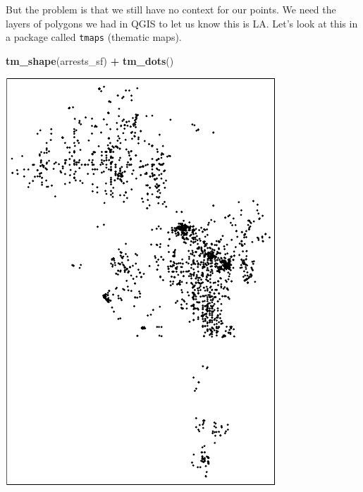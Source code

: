 \documentclass[]{book}
\newenvironment{Shaded}{\begin{snugshade}}{\end{snugshade}}
\newcommand{\KeywordTok}[1]{\textcolor[rgb]{0.13,0.29,0.53}{\textbf{#1}}}
\newcommand{\NormalTok}[1]{#1}
\newcommand{\OperatorTok}[1]{\textcolor[rgb]{0.81,0.36,0.00}{\textbf{#1}}}
\newcommand{\StringTok}[1]{\textcolor[rgb]{0.31,0.60,0.02}{#1}}
\begin{document}
But the problem is that we still have no context for our points. We need the layers of polygons we had in QGIS to let us know this is LA. Let's look at this in a package called \texttt{tmaps} (thematic maps).

\begin{Shaded}
\begin{Highlighting}[]
\KeywordTok{tm_shape}\NormalTok{(arrests_sf) }\OperatorTok{+}\StringTok{ }\KeywordTok{tm_dots}\NormalTok{()}
\end{Highlighting}
\end{Shaded}

\begin{center}\includegraphics[width=\textwidth]{afam-188r_files/figure-latex/unnamed-chunk-17-1} \end{center}
\end{document}
